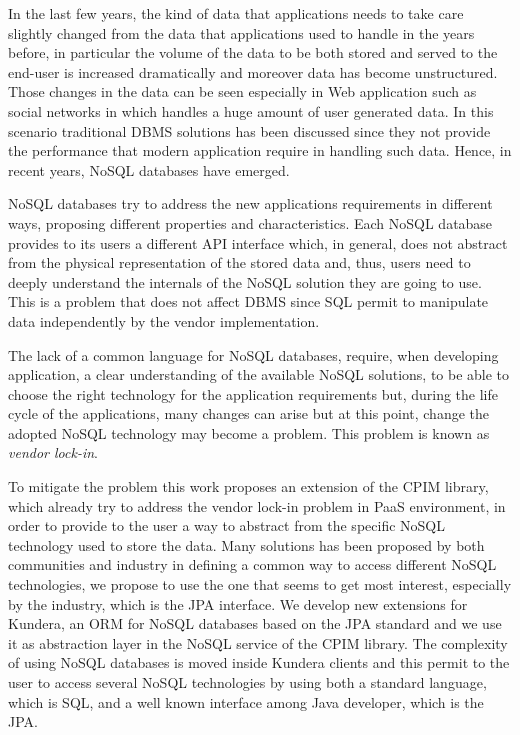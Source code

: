 In the last few years, the kind of data that applications needs to take care slightly changed from the data that applications used to handle in the years before, in particular the volume of the data to be both stored and served to the end-user is increased dramatically and moreover data has become unstructured.
Those changes in the data can be seen especially in Web application such as social networks in which handles a huge amount of user generated data.
In this scenario traditional DBMS solutions has been discussed since they not provide the performance that modern application require in handling such data. Hence, in recent years, NoSQL databases have emerged.

\noindent NoSQL databases try to address the new applications requirements in different ways, proposing different properties and characteristics. Each NoSQL database provides to its users a different API interface which, in general, does not abstract from the physical representation of the stored data and, thus, users need to deeply understand the internals of the NoSQL solution they are going to use. This is a problem that does not affect DBMS since SQL permit to manipulate data independently by the vendor implementation. 

\noindent The lack of a common language for NoSQL databases, require, when developing application, a clear understanding of the available NoSQL solutions, to be able to choose the right technology for the application requirements but, during the life cycle of the applications, many changes can arise but at this point, change the adopted NoSQL technology may become a problem. This problem is known as \textit{vendor lock-in}.  

\noindent To mitigate the problem this work proposes an extension of the CPIM library, which already try to address the vendor lock-in problem in PaaS environment, in order to provide to the user a way to abstract from the specific NoSQL technology used to store the data.
Many solutions has been proposed by both communities and industry in defining a common way to access different NoSQL technologies, we propose to use the one that seems to get most interest, especially by the industry, which is the JPA interface. We develop new extensions for Kundera, an ORM for NoSQL databases based on the JPA standard and we use it as abstraction layer in the NoSQL service of the CPIM library.
The complexity of using NoSQL databases is moved inside Kundera clients and this permit to the user to access several NoSQL technologies by using both a standard language, which is SQL, and a well known interface among Java developer, which is the JPA.

